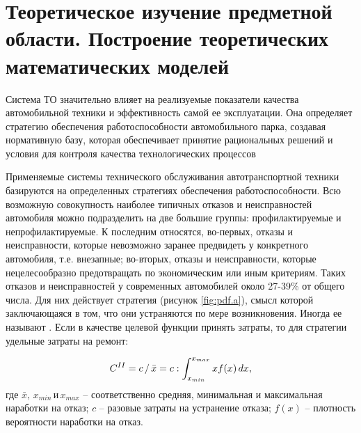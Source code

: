 \documentclass[../nirs.tex]{subfiles}
\begin{document}
\section{Теоретическое изучение предметной области. Построение теоретических
математических моделей}

Система ТО значительно влияет на реализуемые показатели качества автомобильной
техники и эффективность самой ее эксплуатации. Она определяет стратегию
обеспечения работоспособности автомобильного парка, создавая нормативную базу,
которая обеспечивает принятие рациональных решений и условия для контроля
качества технологических процессов

Применяемые системы технического обслуживания автотранспортной техники
базируются на определенных стратегиях обеспечения работоспособности. Всю
возможную совокупность наиболее типичных отказов и неисправностей автомобиля
можно подразделить на две большие группы: профилактируемые и
непрофилактируемые. К последним относятся, во-первых, отказы и неисправности,
которые невозможно заранее предвидеть у конкретного автомобиля, т.е. внезапные;
во-вторых, отказы и неисправности, которые нецелесообразно предотвращать по
экономическим или иным критериям. Таких отказов и неисправностей у современных
автомобилей около 27-39\% от общего числа. Для них действует стратегия 
(рисунок \ref{fig:pdf.a}), смысл которой заключающаяся в том, что они
устраняются по мере возникновения. Иногда ее называют . Если в качестве целевой функции принять затраты, то для
стратегии  удельные затраты на ремонт:

\begin{equation*}
    C^{\rom{2}} =
    c\,/\,\bar{x} =
    c : \int_{x_{min}}^{x_{max}} x f(x)\,dx,
\end{equation*}
где $\bar{x},\,x_{min} \,\text{и} \,x_{max}$ -- соответственно средняя,
минимальная и максимальная наработки на отказ; $c$ -- разовые затраты на
устранение отказа; $f(x)$ -- плотность вероятности наработки на отказ.
\end{document}
